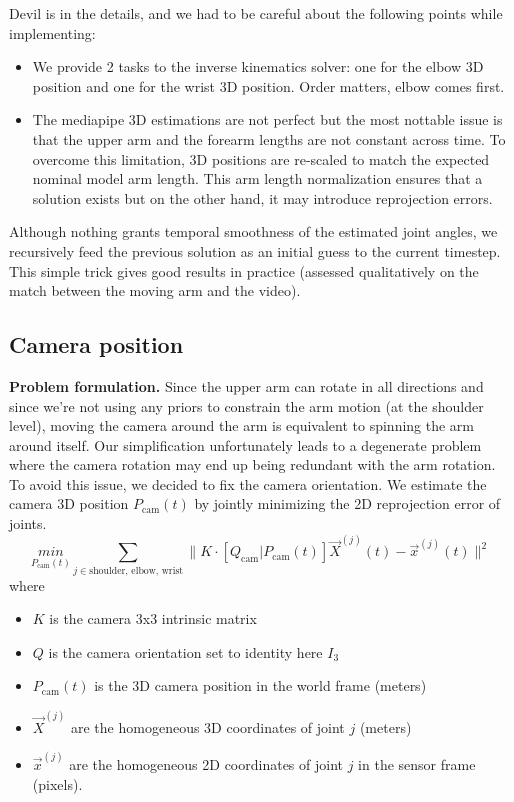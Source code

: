 Devil is in the details, and we had to be careful about the following points while implementing:
\begin{itemize}
    \item We provide 2 tasks to the inverse kinematics solver: one for the elbow 3D position and one for the wrist 3D position. 
    Order matters, elbow comes first.
    \item The mediapipe 3D estimations are not perfect but the most nottable issue is that 
    the upper arm and the forearm lengths are not constant across time. To overcome this limitation,
    3D positions are re-scaled to match the expected nominal model arm length. 
    This arm length normalization ensures that a solution exists but on the other hand, it may introduce reprojection errors.
\end{itemize}
Although nothing grants temporal smoothness of the estimated joint angles, we recursively feed the previous solution as an initial guess to the current timestep.
This simple trick gives good results in practice (assessed qualitatively on the match between the moving arm and the video).


\subsection{Camera position}
\label{subsec:cam_estim}

\noindent\textbf{Problem formulation.} Since the upper arm can rotate in all directions and since we're not using any priors to constrain 
the arm motion (at the shoulder level), moving the camera around the arm is equivalent to spinning the arm around itself. 
Our simplification unfortunately leads to a degenerate problem where the camera rotation may end up being redundant with the arm rotation.
To avoid this issue, we decided to fix the camera orientation. 
We estimate the camera 3D position $P_{\text{cam}}(t)$ 
by jointly minimizing the 2D reprojection error of joints.
$$\underset{P_{\text{cam}}(t)}{min}\sum_{j\in{\text{shoulder, elbow, wrist}}} \|K\cdot\left[Q_{\text{cam}} | P_{\text{cam}}(t)\right] \vec{X}^{(j)}(t) - \vec{x}^{(j)}(t) \|^2$$
where
\begin{itemize}
    \item $K$ is the camera 3x3 intrinsic matrix
    \item $Q$ is the camera orientation set to identity here $I_{3}$
    \item $P_{\text{cam}}(t)$ is the 3D camera position in the world frame (meters)
    \item $\vec{X}^{(j)}$ are the homogeneous 3D coordinates of joint $j$ (meters)
    \item $\vec{x}^{(j)}$ are the homogeneous 2D coordinates of joint $j$ in the sensor frame (pixels).
\end{itemize}

